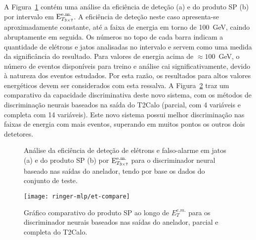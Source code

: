 A Figura~\ref{fig:ringer-efficiency-et} contém uma análise da eficiência de
deteção (a) e do produto SP (b) por intervalo em $\text{E}^{\text{e.m.}}_{T_{3\times7}}$. A eficiência de
deteção neste caso apresenta-se aproximadamente constante, até a faixa de
energia em torno de 100~GeV, caindo abruptamente em seguida. Os números no
topo de cada barra indicam a quantidade de elétrons e jatos analisadas no
intervalo e servem como uma medida da significância do resultado. Para valores
de energia acima de $\approx 100$~GeV, o número de eventos disponíveis para
treino e análise cai significativamente, devido à natureza dos eventos
estudados. Por esta razão, os resultados para altos valores energéticos devem
ser considerados com esta ressalva. A Figura~\ref{fig:ringer-et-compare} traz
um comparativo da capacidade discriminativa deste novo sistema, com os métodos
de discriminação neurais baseados na saída do T2Calo (parcial, com 4 variáveis
e completa com 14 variáveis). Este novo sistema possui melhor discriminação
nas faixas de energia com mais eventos, superando em muitos pontos os outros
dois detetores.

\begin{figure}
\begin{center}
\end{center}
\caption{Análise da eficiência de deteção de elétrons e falso-alarme em jatos
(a) e do produto SP (b) por $\text{E}^{\text{e.m.}}_{T_{3\times7}}$ para o discriminador neural baseado nas
saídas do anelador, tendo por base os dados do conjunto de teste.}
\label{fig:ringer-efficiency-et}
\end{figure}

\begin{figure}
\begin{center}
\texttt{[image: ringer-mlp/et-compare]}
\end{center}
\caption{Gráfico comparativo do produto SP ao longo de $E^{e.m.}_T$ para os
discriminador neurais baseados nas saídas do anelador, parcial e completa do
T2Calo.}
\label{fig:ringer-et-compare}
\end{figure}

